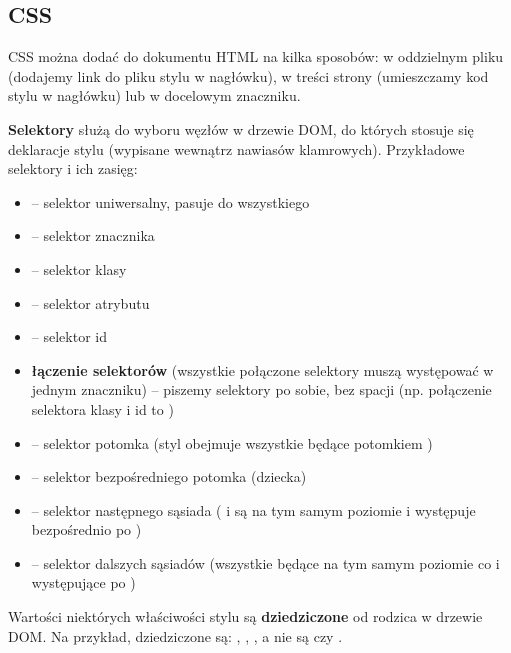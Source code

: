 \subsection{CSS}

CSS można dodać do dokumentu HTML na kilka sposobów: w oddzielnym pliku (dodajemy link do pliku stylu w nagłówku), w treści strony (umieszczamy kod stylu w nagłówku) lub w docelowym znaczniku.

\textbf{Selektory} służą do wyboru węzłów w drzewie DOM, do których stosuje się deklaracje stylu (wypisane wewnątrz nawiasów klamrowych). Przykładowe selektory i ich zasięg:
\begin{itemize}
    \item \cssinline{* { }} -- selektor uniwersalny, pasuje do wszystkiego
    \item {} -- selektor znacznika
    \item {} -- selektor klasy
    \item \cssinline{[atribute] { }} -- selektor atrybutu
    \item {} -- selektor id
    \item \textbf{łączenie selektorów} (wszystkie połączone selektory muszą występować w jednym znaczniku) -- piszemy selektory po sobie, bez spacji (np. połączenie selektora klasy i id to ) 
    \item {} -- selektor potomka (styl obejmuje wszystkie  będące potomkiem )
    \item {} -- selektor bezpośredniego potomka (dziecka)
    \item {} -- selektor następnego sąsiada ( i  są na tym samym poziomie i  występuje bezpośrednio po )
    \item {} -- selektor dalszych sąsiadów (wszystkie  będące na tym samym poziomie co  i występujące po )
\end{itemize}

Wartości niektórych właściwości stylu są \textbf{dziedziczone} od rodzica w drzewie DOM. Na przykład, dziedziczone są: , , , a nie są  czy .

